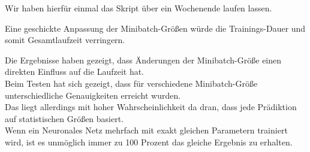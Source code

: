 \documentclass[8pt,a4paper]{article}
\begin{document}
Wir haben hierfür einmal das Skript über ein Wochenende laufen lassen.

Eine geschickte Anpassung der Minibatch-Größen würde die Trainings-Dauer und somit Gesamtlaufzeit verringern.

Die Ergebnisse haben gezeigt, dass Änderungen der Minibatch-Größe einen direkten Einfluss auf die Laufzeit hat.\\
Beim Testen hat sich gezeigt, dass für verschiedene Minibatch-Größe unterschiedliche Genauigkeiten erreicht wurden.\\
Das liegt allerdings mit hoher Wahrscheinlichkeit da dran, dass jede Prädiktion auf statistischen Größen basiert.\\
Wenn ein Neuronales Netz mehrfach mit exakt gleichen Parametern trainiert wird, ist es  unmöglich immer zu 100 Prozent das gleiche Ergebnis zu erhalten.
\end{document}
